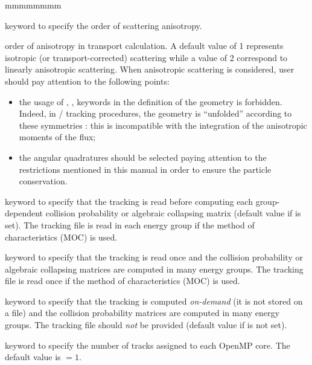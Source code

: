 \begin{ListeDeDescription}{mmmmmmmm}

\item[\moc{ANIS}] keyword to specify the order of scattering anisotropy. 

\item[\dusa{nanis}] order of anisotropy in transport calculation.
A default value of 1 represents isotropic (or transport-corrected) scattering while a value of 2
correspond to linearly anisotropic scattering. When anisotropic scattering is considered, user should pay attention to the following points:
\begin{itemize}
\item the usage of , ,  keywords in the definition of the geometry is forbidden. Indeed, in / tracking procedures, the geometry is ``unfolded'' according to these symmetries : this is incompatible with the integration of the anisotropic moments of the flux; \\
\item the angular quadratures should be selected paying attention to the restrictions mentioned in this manual in order to ensure the particle conservation.
\end{itemize}

\item[\moc{ONEG}] keyword to specify that the tracking is read before computing each group-dependent collision
probability or algebraic collapsing matrix (default value if  is set). The tracking file is
read in each energy group if the method of characteristics (MOC) is used.

\item[\moc{ALLG}] keyword to specify that the tracking is read once and the collision
probability or algebraic collapsing matrices are computed in many energy groups.  The tracking file is
read once if the method of characteristics (MOC) is used.
 
\item[\moc{XCLL}] keyword to specify that the tracking is computed {\sl on-demand} (it is not stored on a file) and the
collision probability matrices are computed in many energy groups. The tracking
file  should {\sl not} be provided (default value if  is not set).

\item[\moc{BATCH}] keyword to specify the number of tracks assigned to each OpenMP core. The default value is $=1$.


\end{ListeDeDescription}
